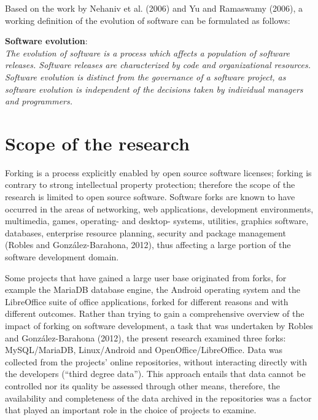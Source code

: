 \noindent
Based on the work by Nehaniv et al. (2006) and Yu and Ramaswamy (2006), a working definition of the evolution of software can be formulated as follows:

\begin{description}
\item{\textbf{Software evolution}}: \hfill \\ \textit{The evolution of software is a process which affects a population of software releases. Software releases are characterized by code and organizational resources. Software evolution is distinct from the governance of a software project, as software evolution is independent of the decisions taken by individual managers and programmers.}
\end{description}



\section{Scope of the research}

Forking is a process explicitly enabled by open source software licenses; forking is contrary to strong intellectual property protection; therefore the scope of the research is limited to open source software. Software forks are known to have occurred in the areas of networking, web applications, development environments, multimedia, games, operating- and desktop- systems, utilities, graphics software, databases, enterprise resource planning, security and package management (Robles and González-Barahona, 2012), thus affecting a large portion of the software development domain.

Some projects that have gained a large user base originated from forks, for example the MariaDB database engine, the Android operating system and the LibreOffice suite of office applications, forked for different reasons and with different outcomes. Rather than trying to gain a comprehensive overview of the impact of forking on software development, a task that was undertaken by Robles and González-Barahona (2012), the present research examined three forks: MySQL/MariaDB, Linux/Android and OpenOffice/LibreOffice. Data was collected from the projects' online repositories, without interacting directly with the developers (“third degree data”). This approach entails that data cannot be controlled nor its quality be assessed through other means, therefore, the availability and completeness of the data archived in the repositories was a factor that played an important role in the choice of projects to examine.

